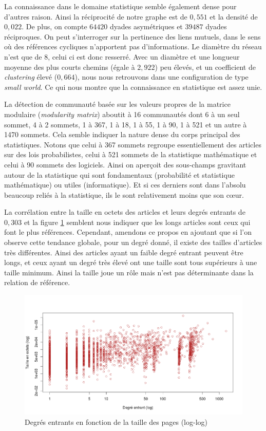 \documentclass[a4paper]{article}
\begin{document}
La connaissance dans le domaine statistique semble également dense pour d'autres raison. Ainsi la réciprocité de notre graphe est de $0,551$ et la densité de $0,022$. De plus, on compte $64420$ dyades asymétriques et $39487$ dyades réciproques. On peut s'interroger sur la pertinence des liens mutuels, dans le sens où des références cycliques n'apportent pas d'informations. Le diamètre du réseau n'est que de $8$, celui ci est donc resserré. Avec un diamètre et une longueur moyenne des plus courts chemins (égale à $2,922$) peu élevés, et un coefficient de \textit{clustering} élevé ($0,664$), nous nous retrouvons dans une configuration de type \textit{small world}. Ce qui nous montre que la connaissance en statistique est assez unie.

La détection de communauté basée sur les valeurs propres de la matrice modulaire (\textit{modularity matrix}) aboutit à 16 communautés dont 6 à un seul sommet, 4 à 2 sommets, 1 à 367, 1 à 18, 1 à 55, 1 à 90, 1 à 521 et un autre à 1470 sommets. Cela semble indiquer la nature dense du corps principal des statistiques. Notons que celui à 367 sommets regroupe essentiellement des articles sur des lois probabilistes, celui à 521 sommets de la statistique mathématique et celui à 90 sommets des logiciels. Ainsi on aperçoit des sous-champs gravitant autour de la statistique qui sont fondamentaux (probabilité et statistique mathématique) ou utiles (informatique). Et si ces derniers sont dans l'absolu beaucoup reliés à la statistique, ils le sont relativement moins que son cœur.

La corrélation entre la taille en octets des articles et leurs degrés entrants de $0,303$ et la figure \ref{size-deg-in} semblent nous indiquer que les longs articles sont ceux qui font le plus références. Cependant, amendons ce propos en ajoutant que si l'on observe cette tendance globale, pour un degré donné, il existe des tailles d'articles très différentes. Ainsi des articles ayant un faible degré entrant peuvent être longs, et ceux ayant un degré très élevé ont une taille sont tous supérieurs à une taille minimum. Ainsi la taille joue un rôle mais n'est pas déterminante dans la relation de référence.

\begin{figure}[h!]
   \centering
   \caption{\label{size-deg-in} Degrés entrants en fonction de la taille des pages (log-log)}
   \includegraphics[scale=0.40]{../images/size_d_in}
\end{figure}
\end{document}
